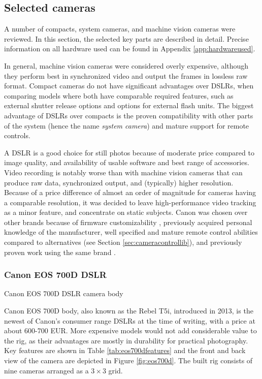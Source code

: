 
\subsection{Selected cameras} %

A number of compacts, system cameras, and machine vision cameras were reviewed.
In this section, the selected key parts are described in detail.
Precise information on all hardware used can be found in Appendix \ref{app:hardwareused}.

In general, machine vision cameras were considered overly expensive, although they perform best in synchronized video and output the frames in lossless raw format.
Compact cameras do not have significant advantages over DSLRs, when comparing models where both have comparable required features, such as external shutter release options and options for external flash units.
The biggest advantage of DSLRs over compacts is the proven compatibility with other parts of the system (hence the name \emph{system camera}) and mature support for remote controls.

A DSLR is a good choice for still photos because of moderate price compared to image quality, and availability of usable software and best range of accessories.
Video recording is notably worse than with machine vision cameras that can produce raw data, synchronized output, and (typically) higher resolution.
Because of a price difference of almost an order of magnitude for cameras having a comparable resolution, it was decided to leave high-performance video tracking as a minor feature, and concentrate on static subjects.
Canon was chosen over other brands because of firmware customizability \cite{magiclantern}, previously acquired personal knowledge of the manufacturer, well specified and mature remote control abilities compared to alternatives (see Section \ref{sec:cameracontrollib}), and previously proven work using the same brand \cite{ir-ltd,ten24,capturelab,agisoftforum,ghosh2011multiview}.

\subsubsection{Canon EOS 700D DSLR}

{Canon EOS 700D DSLR camera body}

Canon EOS 700D body, also known as the Rebel T5i, introduced in 2013, is the newest of Canon's consumer range DSLRs at the time of writing, with a price at about 600-700 EUR.
More expensive models would not add considerable value to the rig, as their advantages are mostly in durability for practical photography.
Key features are shown in Table \ref{tab:eos700dfeatures} and the front and back view of the camera are depicted in Figure \ref{fig:eos700d}.
The built rig consists of nine cameras arranged as a $3 \times 3$ grid.

